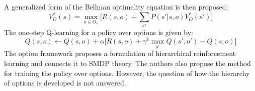 A generalized form of the Bellman optimality equation is then proposed:
\begin{equation}
    V_O^*(s) = \max_{o \in O_s} \big[ R(s,o)+\sum_{s'}P(s' \lvert s,o) V_O^*(s') \big]
\end{equation}
The one-step Q-learning for a policy over options is given by:
\begin{equation}
    Q(s,o) \gets Q(s,o)+ \alpha \big[ R(s,o)+\gamma^k \max_{o'} Q(s',o')  - Q(s,o)\big]
\end{equation}
The option framework proposes a formulation of hierarchical reinforcement learning and connects it to SMDP theory. The authors also propose the method for training the policy over options. However, the question of how the hierarchy of options is developed is not answered.

